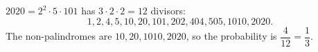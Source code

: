 $2020=2^2\cdot5\cdot101$ has $3\cdot2\cdot2=12$ divisors:
\[1,2,4,5,10,20,101,202,404,505,1010,2020.\]
The non-palindromes are $10,20,1010,2020$, so the probability is $\dfrac4{12}=\boxed{\dfrac13}$.
